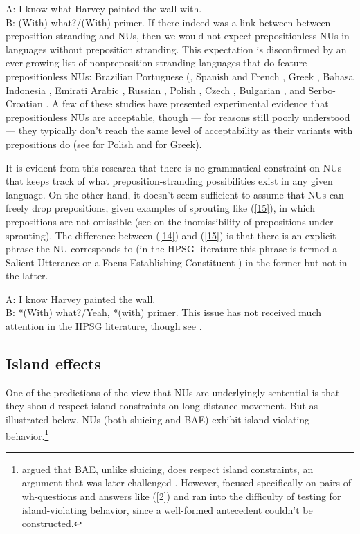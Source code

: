 \documentclass[output=paper
                ,modfonts
                ,nonflat
	        ,collection
	        ,collectionchapter
	        ,collectiontoclongg
 	        ,biblatex
                ,babelshorthands
                ,newtxmath
                ,draftmode
                ,colorlinks, citecolor=brown
]{./langsci/langscibook}
\begin{document}
{\ea A: I know what Harvey painted the wall with.\\B: (With) what?/(With) primer.\label{14}\z
If there indeed was a link between between preposition stranding and NUs, then we would not expect prepositionless NUs in languages without preposition stranding. This expectation is disconfirmed by an ever-growing list of nonpreposition-stranding languages that do feature prepositionless NUs: Brazilian Portuguese (\citep{AlmeidaYoshida 2007}, Spanish and French \citep{Rodrigues2009}, Greek \citep{Molimpakis2018}, Bahasa Indonesia \citep{Fortin2007}, Emirati Arabic \citep{Leung2014}, Russian \citep{Philippova2014}, Polish \citep{Szczegielniak2008, Nykiel2013, Sag2011}, Czech \citep{Caha2011}, Bulgarian \citep{Abels2017}, and Serbo-Croatian \citep{Stjepanovic2008, Stjepanovic2012}. A few of these studies have presented experimental evidence that prepositionless NUs are acceptable, though --- for reasons still poorly understood --- they typically don't reach the same level of acceptability as their variants with prepositions do (see \citealt{Nykiel2013} for Polish and \citealt{Molimpakis2018} for Greek).

It is evident from this research that there is no grammatical constraint on NUs that keeps track of what preposition-stranding possibilities exist in any given language. On the other hand, it doesn't seem sufficient to assume that NUs can freely drop prepositions, given examples of sprouting like (\ref{15}), in which prepositions are not omissible (see \citealt{Chung1995} on the inomissibility of prepositions under sprouting). The difference between (\ref{14}) and (\ref{15}) is that there is an explicit phrase the NU corresponds to (in the HPSG literature this phrase is termed a Salient Utterance \citep{Ginzburg2000} or a Focus-Establishing Constituent \citep{Ginzburg2012}) in the former but not in the latter.

\ea A: I know Harvey painted the wall.\\B: *(With) what?/Yeah, *(with) primer.\label{15}\z
This issue has not received much attention in the HPSG literature, though see \citet{Kim2015}.


\subsection{Island effects}
One of the predictions of the view that NUs are underlyingly sentential is that they should respect island constraints on long-distance movement. But as illustrated below, NUs (both sluicing and BAE) exhibit island-violating behavior.\footnote{\citet{Merchant2004} argued that BAE, unlike sluicing, does respect island constraints, an argument that was later challenged \citep[see e.g,][]{Culicover2005, Griffiths2014}. However, \citet{Merchant2004} focused specifically on pairs of wh-questions and answers like (\ref{2}) and ran into the difficulty of testing for island-violating behavior, since a well-formed antecedent couldn't be constructed.}

}
\end{document}
